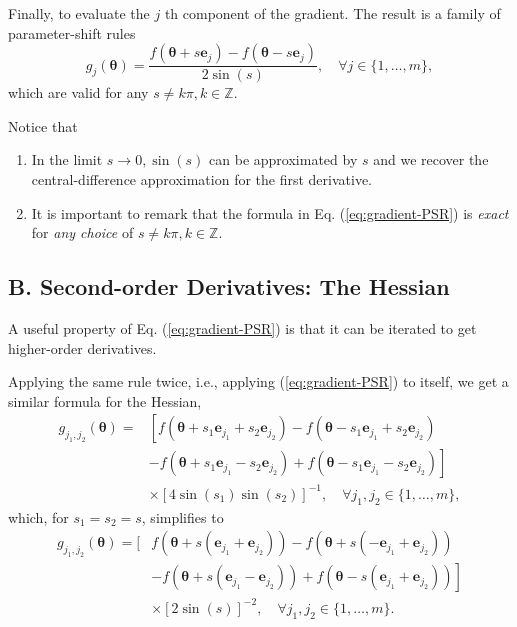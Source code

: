 \begin{theorem}
    Finally, to evaluate the $j$ th component of the gradient. The result is a family of parameter-shift rules
\begin{equation}\label{eq:gradient-PSR}
    g_j(\boldsymbol{\theta})=\frac{f\left(\boldsymbol{\theta}+s \mathbf{e}_j\right)-f\left(\boldsymbol{\theta}-s \mathbf{e}_j\right)}{2 \sin (s)}, \quad \forall j \in \{1,\dots,m\},
\end{equation}
which are valid for any $s \neq k \pi, k \in \mathbb{Z}$.
\end{theorem}

Notice that
\begin{enumerate}
    \item In the limit $s \rightarrow 0, \sin (s)$ can be approximated by $s$ and we recover the central-difference approximation for the first derivative.
    \item It is important to remark that the formula in Eq. (\ref{eq:gradient-PSR}) is \textit{exact} for \textit{any choice} of $s \neq k \pi, k \in \mathbb{Z}$.
\end{enumerate}

\subsection{B. Second-order Derivatives: The Hessian}

A useful property of Eq. (\ref{eq:gradient-PSR}) is that it can be iterated to get higher-order derivatives. 

\begin{theorem}
    Applying the same rule twice, i.e., applying (\ref{eq:gradient-PSR}) to itself, we get a similar formula for the Hessian,
\begin{align}
g_{j_1, j_2}(\boldsymbol{\theta})= & {\left[f\left(\boldsymbol{\theta}+s_1 \mathbf{e}_{j_1}+s_2 \mathbf{e}_{j_2}\right)-f\left(\boldsymbol{\theta}-s_1 \mathbf{e}_{j_1}+s_2 \mathbf{e}_{j_2}\right)\right.} \\
& \left.-f\left(\boldsymbol{\theta}+s_1 \mathbf{e}_{j_1}-s_2 \mathbf{e}_{j_2}\right)+f\left(\boldsymbol{\theta}-s_1 \mathbf{e}_{j_1}-s_2 \mathbf{e}_{j_2}\right)\right] \\
& \times \left[4 \sin \left(s_1\right) \sin \left(s_2\right)\right]^{-1}, \quad \forall j_1,j_2 \in \{1,\dots,m\},
\end{align}
which, for $s_1=s_2=s$, simplifies to
\begin{align}\label{eq:hessiamPSR}
g_{j_1, j_2}(\boldsymbol{\theta})=[ & f\left(\boldsymbol{\theta}+s\left(\mathbf{e}_{j_1}+\mathbf{e}_{j_2}\right)\right)-f\left(\boldsymbol{\theta}+s\left(-\mathbf{e}_{j_1}+\mathbf{e}_{j_2}\right)\right) \\
& \left.-f\left(\boldsymbol{\theta}+s\left(\mathbf{e}_{j_1}-\mathbf{e}_{j_2}\right)\right)+f\left(\boldsymbol{\theta}-s\left(\mathbf{e}_{j_1}+\mathbf{e}_{j_2}\right)\right)\right] \\
& \times  [2 \sin (s)]^{-2} , \quad \forall j_1,j_2 \in \{1,\dots,m\}.
\end{align}
\end{theorem}

